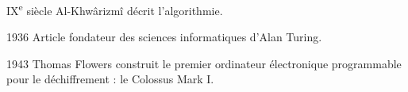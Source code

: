 \begin{frame}{IX\textsuperscript{e} siècle}
    Al-Khwârizmî décrit l'algorithmie.
\end{frame}

\begin{frame}{1936}
    Article fondateur des sciences informatiques d'Alan Turing.
\end{frame}

\begin{frame}{1943}
    Thomas Flowers construit le premier ordinateur électronique programmable pour le déchiffrement : le Colossus Mark I.
\end{frame}

